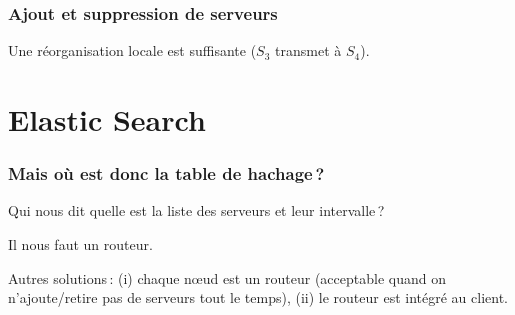 \begin{frame}
\frametitle{Ajout et suppression de serveurs}



\vfill

Une réorganisation \alert{locale} est suffisante ($S_3$ transmet à $S_4$).

\end{frame}

\section{Elastic Search}


\begin{frame}
\frametitle{Mais où est donc la table de hachage\,?}

\alert{Qui nous dit quelle est la liste des serveurs et leur intervalle}\,?

\smallskip

Il nous faut un \alert{routeur}.

\smallskip

\smallskip

Autres solutions\,: (i) chaque nœud est un routeur (acceptable
quand on n'ajoute/retire pas de serveurs tout le temps), (ii) le routeur est intégré au client.

\end{frame}



